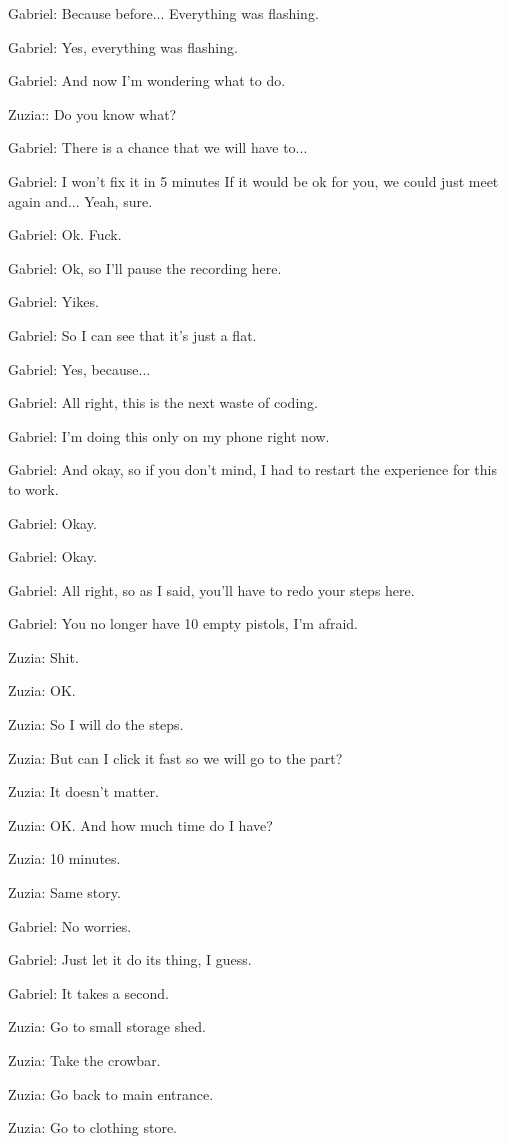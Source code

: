 Gabriel: Because before... Everything was flashing.

Gabriel: Yes, everything was flashing.

Gabriel: And now I'm wondering what to do.

Zuzia:: Do you know what?

Gabriel: There is a chance that we will have to...

Gabriel: I won't fix it in 5 minutes If it would be ok for you, we could just meet again and... Yeah, sure.

Gabriel: Ok. Fuck.

Gabriel: Ok, so I'll pause the recording here.

Gabriel: Yikes.

Gabriel: So I can see that it's just a flat.

Gabriel: Yes, because...

Gabriel: All right, this is the next waste of coding.

Gabriel: I'm doing this only on my phone right now.

Gabriel: And okay, so if you don't mind, I had to restart the experience for this to work.

Gabriel: Okay.

Gabriel: Okay.

Gabriel: All right, so as I said, you'll have to redo your steps here.

Gabriel: You no longer have 10 empty pistols, I'm afraid.

Zuzia: Shit.

Zuzia: OK.

Zuzia: So I will do the steps.

Zuzia: But can I click it fast so we will go to the part?

Zuzia: It doesn't matter.

Zuzia: OK. And how much time do I have?

Zuzia: 10 minutes.

Zuzia: Same story.

Gabriel: No worries.

Gabriel: Just let it do its thing, I guess.

Gabriel: It takes a second.

Zuzia: Go to small storage shed.

Zuzia: Take the crowbar.

Zuzia: Go back to main entrance.

Zuzia: Go to clothing store.

